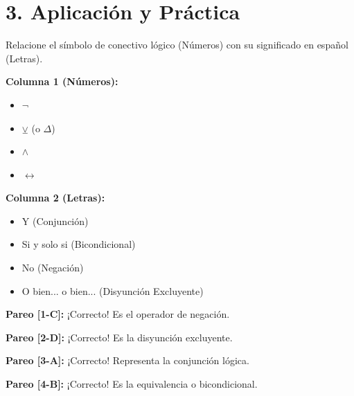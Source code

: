 \documentclass[11pt]{article}
\newenvironment{aplicacion}{\section*{3. Aplicación y Práctica}}{}
\newenvironment{pareadosdoscolumnas}[1]{\begin{tcolorbox}[colback=violet!5,colframe=violet!75!black,title=Términos Pareados (2 Columnas): #1]}{\end{tcolorbox}}
\newcommand{\columnaI}[1]{\par\medskip\textbf{Columna 1 (Números):}\par\begin{itemize}#1\end{itemize}}
\newcommand{\columnaII}[1]{\par\medskip\textbf{Columna 2 (Letras):}\par\begin{itemize}#1\end{itemize}}
\newcommand{\pareo}[2]{\par\smallskip\textbf{Pareo [#1]:} #2\par}
\begin{document}
\begin{aplicacion}
  \begin{pareadosdoscolumnas}{Símbolos Lógicos}
    Relacione el símbolo de conectivo lógico (Números) con su significado en español (Letras).
    \columnaI{
      \item[1.] $\neg$
      \item[2.] $\veebar$ (o $\Delta$)
      \item[3.] $\wedge$
      \item[4.] $\leftrightarrow$
    }
    \columnaII{
      \item[A.] Y (Conjunción)
      \item[B.] Si y solo si (Bicondicional)
      \item[C.] No (Negación)
      \item[D.] O bien... o bien... (Disyunción Excluyente)
    }
    
    \pareo{1-C}{¡Correcto! Es el operador de negación.}
    \pareo{2-D}{¡Correcto! Es la disyunción excluyente.}
    \pareo{3-A}{¡Correcto! Representa la conjunción lógica.}
    \pareo{4-B}{¡Correcto! Es la equivalencia o bicondicional.}
  \end{pareadosdoscolumnas}

\end{aplicacion}
\end{document}
